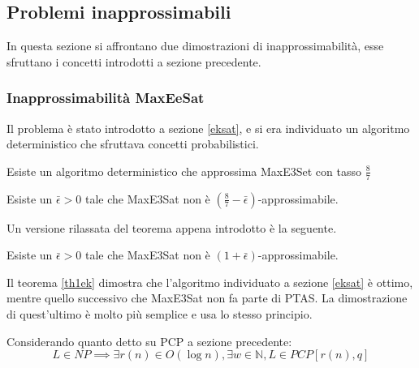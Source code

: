 \subsection{Problemi inapprossimabili}
In questa sezione si affrontano due dimostrazioni di inapprossimabilità, 
esse sfruttano i concetti introdotti a sezione precedente.

\subsubsection{Inapprossimabilità MaxEeSat}
Il problema è stato introdotto a sezione \ref{eksat}, e si era individuato un algoritmo 
deterministico che sfruttava concetti probabilistici.

\begin{theorem}
    Esiste un algoritmo deterministico che approssima MaxE3Set con tasso
    $\frac{8}{7}$
\end{theorem}

\begin{theorem}
    \label{th1ek}
    Esiste un $\bar{\epsilon} > 0$ tale che MaxE3Sat non è $(\frac{8}{7}-\bar{\epsilon})$-approssimabile. 
\end{theorem}

Un versione rilassata del teorema appena introdotto è la seguente.
\begin{theorem}
    Esiste un $\bar{\epsilon} > 0$ tale che MaxE3Sat non è $(1+\bar{\epsilon})$-approssimabile. 
\end{theorem}

\begin{remark}
    Il teorema \ref{th1ek} dimostra che l'algoritmo individuato a sezione \ref{eksat} è ottimo, 
    mentre quello successivo che MaxE3Sat non fa parte di PTAS. La dimostrazione di quest'ultimo è
    molto più semplice e usa lo stesso principio.
\end{remark}

Considerando quanto detto su PCP a sezione precedente: 
$$L \in NP \implies \exists r(n) \in O(\log n), \exists w \in \mathbb{N}, L \in PCP[r(n), q]$$



